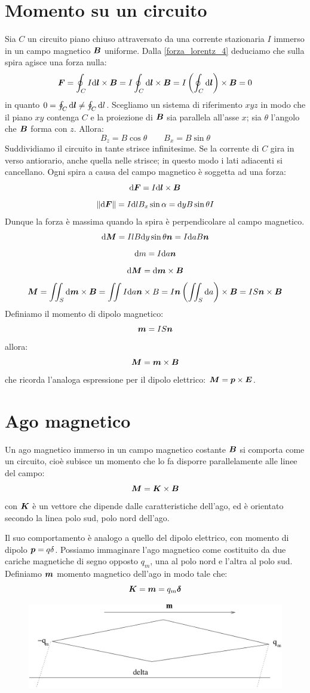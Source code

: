 \section{Momento su un circuito}
Sia $C$ un circuito piano chiuso attraversato da una corrente stazionaria $I$ immerso in un campo magnetico $\boldsymbol{B}$ uniforme. Dalla \eqref{forza_lorentz_4} deduciamo che sulla spira agisce una forza nulla:
\[\boldsymbol{F}=\oint_C I\mathrm{d}\boldsymbol{l}\times\boldsymbol{B}=I\oint_C\mathrm{d} \boldsymbol{l}\times\boldsymbol{B}=I\left(\oint_C\mathrm{d}\boldsymbol{l}\right)\times\boldsymbol{B}=0\]
in quanto $0=\oint_C \mathrm{d} \boldsymbol{l}\neq\oint_C\mathrm{d} l$. Scegliamo un sistema di riferimento $xyz$ in modo che il piano $xy$ contenga $C$ e la proiezione di $\boldsymbol{B}$ sia parallela all'asse $x$; sia $\theta$ l'angolo che $\boldsymbol{B}$ forma con $z$. Allora:
\[B_z=B\cos\theta\qquad B_x=B\sin\theta\]
Suddividiamo il circuito in tante strisce infinitesime. Se la corrente di $C$ gira in verso antiorario, anche quella nelle strisce; in questo modo i lati adiacenti si cancellano. Ogni spira a causa del campo magnetico è soggetta ad una forza:
\[\mathrm{d}\boldsymbol{F}=I\mathrm{d}\boldsymbol{l}\times\boldsymbol{B}\]
\[\left\lVert\mathrm{d}\boldsymbol{F}\right\rVert=I\mathrm{d} lB_x\sin\alpha=\mathrm{d} yB\sin\theta I\]
Dunque la forza è massima quando la spira è perpendicolare al campo magnetico.
\[\mathrm{d} \boldsymbol{M}=IlB\mathrm{d} y\sin\theta\boldsymbol{n}=I\mathrm{d} a B\boldsymbol{n}\]
\[\mathrm{d} m=I\mathrm{d} a\boldsymbol{n}\]
\[\mathrm{d}\boldsymbol{M}=\mathrm{d}\boldsymbol{m}\times\boldsymbol{B}\]
\[\boldsymbol{M}=\iint_S\mathrm{d}\boldsymbol{m}\times \boldsymbol{B}=\iint I\mathrm{d} a\boldsymbol{n}\times B=I\boldsymbol{n}\left(\iint_S\mathrm{d} a\right)\times \boldsymbol{B}=IS\boldsymbol{n}\times \boldsymbol{B}\]
Definiamo il momento di dipolo magnetico:
\begin{equation}
\boldsymbol{m}=IS\boldsymbol{n}
\label{eq:dipolo_magnetico}
\end{equation}
allora:
\[\boldsymbol{M}=\boldsymbol{m}\times \boldsymbol{B}\]
che ricorda l'analoga espressione per il dipolo elettrico: $\boldsymbol{M}=\boldsymbol{p}\times\boldsymbol{E}$.
\section{Ago magnetico}
Un ago magnetico immerso in un campo magnetico costante $\boldsymbol{B}$ si comporta come un circuito, cioè subisce un momento che lo fa disporre parallelamente alle linee del campo:
\[\boldsymbol{M}=\boldsymbol{K}\times\boldsymbol{B}\]
con $\boldsymbol{K}$ è un vettore che dipende dalle caratteristiche dell'ago, ed è orientato secondo la linea polo sud, polo nord dell'ago.

Il suo comportamento è analogo a quello del dipolo elettrico, con momento di dipolo $\boldsymbol{p}=q\delta$. Possiamo immaginare l'ago magnetico come costituito da due cariche magnetiche di segno opposto $q_m$, una al polo nord e l'altra al polo sud. Definiamo $\boldsymbol{m}$ momento magnetico dell'ago in modo tale che:
\[\boldsymbol{K}=\boldsymbol{m}=q_m \boldsymbol{\delta}\]
\begin{figure}[htbp]
  \centering
  \includegraphics[scale=0.5]{immagini/fisica2/ago}
\end{figure}
